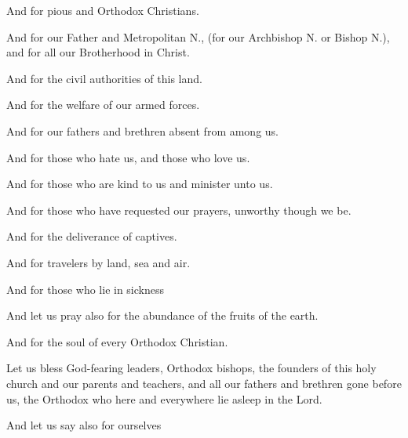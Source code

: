 \documentclass[twoside, letterpaper, 12pt]{report}
\begin{document}
\begin{priest}
  \item And for pious and Orthodox Christians.
  \item And for our Father and Metropolitan N.,
    (for our Archbishop N. or Bishop N.), and for all our Brotherhood in Christ.
  \item And for the civil authorities of this land.
  \item And for the welfare of our armed forces.
  \item And for our fathers and brethren absent from among us.
  \item And for those who hate us, and those who love us.
  \item And for those who are kind to us and minister unto us.
  \item And for those who have requested our prayers, unworthy though we be.
  \item And for the deliverance of captives.
  \item And for travelers by land, sea and air.
  \item And for those who lie in sickness
  \item And let us pray also for the abundance of the fruits of the earth.
  \item And for the soul of every Orthodox Christian.
  \item Let us bless God-fearing leaders, Orthodox bishops,
    the founders of this holy church and our parents and teachers,
    and all our fathers and brethren gone before us,
    the Orthodox who here and everywhere lie asleep in the Lord.
  \item And let us say also for ourselves
\end{priest}






\end{document}
